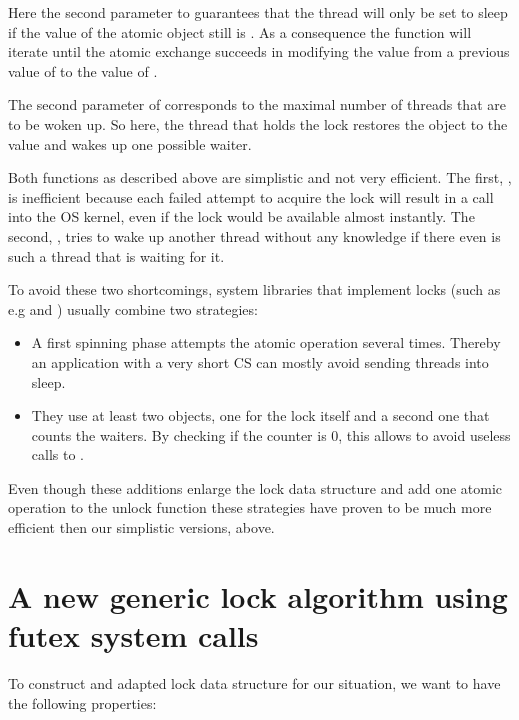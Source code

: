 \iflong%
Here the second parameter to  guarantees that the thread
will only be set to sleep if the value of the atomic object 
still is . As a consequence the  function will iterate until the
atomic exchange succeeds in modifying the value from a previous
value of  to the value of .

The second parameter of  corresponds to the maximal
number of threads that are to be woken up. So here, the thread that
holds the lock restores the object  to the value  and wakes
up one possible waiter.
\fi

Both functions as described above are simplistic and not very
efficient. The first, , is inefficient because each failed
attempt to acquire the lock will result in a call into the OS
kernel, even if the lock would be available almost instantly.  The
second, , tries to wake up another thread without any
knowledge if there even is such a thread that is waiting for it.

\iflong
To avoid these two shortcomings, system libraries that implement
locks (such as e.g  and ) usually combine two
strategies:\itemadjust

\begin{itemize}
\item A first spinning phase attempts the atomic operation several
times. Thereby an application with a very short CS can mostly
avoid sending threads into sleep.\itemadjust

\item They use at least two  objects, one for the lock itself
and a second one that counts the waiters. By checking if the
counter is 0, this allows to avoid useless calls to
.\itemadjust
\end{itemize}

Even though these additions enlarge the lock data structure and add
one atomic operation to the unlock function these strategies have
proven to be much more efficient then our simplistic versions,
above.
\fi

\section{A new generic lock algorithm using futex system calls}
\label{sec-3}

\iflong%
To construct and adapted lock data structure for our situation, we
want to have the following properties:

